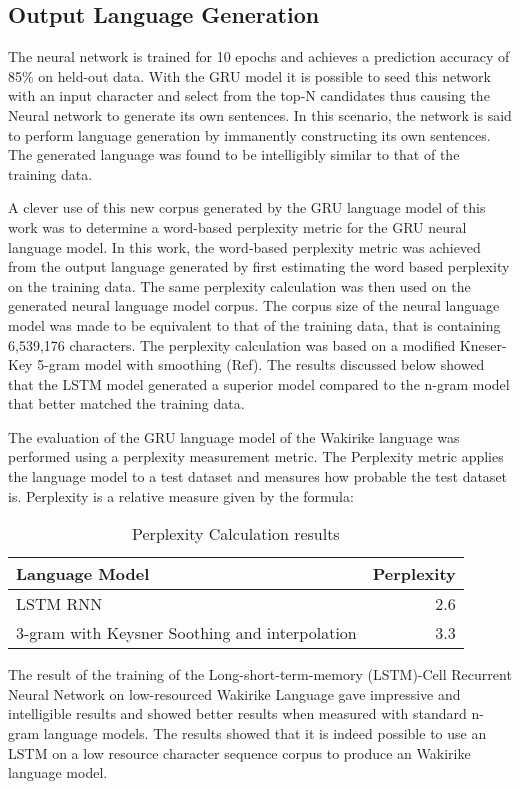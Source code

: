 \subsection{Output Language Generation}
The neural network is trained for 10 epochs and achieves a prediction accuracy of 85\% on held-out data.  With the GRU model it is possible to seed this network with an input character and select from the top-N candidates thus causing the Neural network to generate its own sentences.  In this scenario, the network is said to perform language generation by immanently constructing its own sentences.  The generated language was found to be intelligibly similar to that of the training data. 

A clever use of this new corpus generated by the GRU language model of this work was to determine a word-based perplexity metric for the GRU neural language model. In this work, the word-based perplexity metric was achieved from the output language generated by first estimating the word based perplexity on the training data.  The same perplexity calculation was then used on the generated neural language model corpus. The corpus size of the neural language model was made to be equivalent to that of the training data, that is containing 6,539,176 characters.  The perplexity calculation was based on a modified Kneser-Key 5-gram model with smoothing (Ref).  The results discussed below showed that the LSTM model generated a superior model compared to the n-gram model that better matched the training data.

The evaluation of the GRU language model of the Wakirike language was performed using a perplexity measurement metric. The Perplexity metric applies the language model to a test dataset and measures how probable the test dataset is. Perplexity is a relative measure given by the formula:


\begin{table}
  \caption{Perplexity Calculation results}
  \label{tab:example}
\begin{tabular}{lr}
\toprule
Language Model & Perplexity\\
\midrule
LSTM RNN & 2.6\\
3-gram with Keysner Soothing and interpolation & 3.3\\
\bottomrule
\end{tabular}
\end{table}


The result of the training of the Long-short-term-memory (LSTM)-Cell Recurrent Neural Network on low-resourced Wakirike Language gave impressive and intelligible results and showed better results when measured with standard n-gram language models. The results showed that it is indeed possible to use an LSTM on a low resource character sequence corpus to produce an Wakirike language model.


